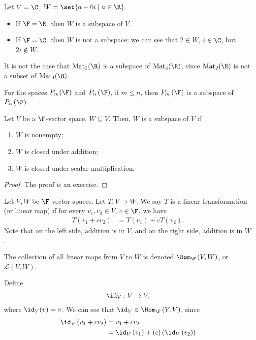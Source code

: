 \documentclass[10pt]{mypackage}
\begin{document}
\begin{example}[Subspaces of $\C$]
  Let $V = \C$, $W = \set{a + 0i\mid a\in \R}$.
  \begin{itemize}
    \item If $\F = \R$, then $W$ is a subspace of $V$.
    \item If $\F = \C$, then $W$ is not a subspace; we can see that $2\in W$, $i\in \C$, but $2i\notin W$.
  \end{itemize}
\end{example}
\begin{example}[Matrices]
  It is not the case that $\text{Mat}_2(\R)$ is a subspace of $\text{Mat}_4(\R)$, since $\text{Mat}_2(\R)$ is not a subset of $\text{Mat}_4(\R)$.
\end{example}
\begin{example}[Polynomials]
  For the spaces $P_{m}(\F)$ and $P_{n}\left(\F\right)$, if $m \leq n$, then $P_{m}\left(\F\right)$ is a subspace of $P_{n}\left(\F\right)$.
\end{example}
\begin{lemma}
  Let $V$ be a $\F$-vector space, $W\subseteq V$. Then, $W$ is a subspace of $V$ if
  \begin{enumerate}[(1)]
    \item $W$ is nonempty;
    \item $W$ is closed under addition;
    \item $W$ is closed under scalar multiplication.
  \end{enumerate}
\end{lemma}
\begin{proof}
  The proof is an exercise.
\end{proof}
\begin{definition}
  Let $V,W$ be $\F$-vector spaces. Let $T: V\rightarrow W$. We say $T$ is a linear transformation (or linear map) if for every $v_1,v_2\in V$, $c\in \F$, we have
  \begin{align*}
    T\left(v_1 + cv_2\right) &= T\left(v_1\right) + cT\left(v_2\right).
  \end{align*}
  Note that on the left side, addition is in $V$, and on the right side, addition is in $W$.\newline

  The collection of all linear maps from $V$ to $W$ is denoted $\Hom_{\F}\left(V,W\right)$, or $\mathcal{L}\left(V,W\right)$.
\end{definition}
\begin{example}
  Define
  \begin{align*}
    \id_{V}: V\rightarrow V,
  \end{align*}
  where $\id_V(v) = v$. We can see that $\id_V \in \Hom_{\F}\left(V,V\right)$, since
  \begin{align*}
    \id_V\left(v_1 + cv_2\right) &= v_1 + cv_2\\
                            &= \id_V\left(v_1\right) + (c)\left(\id_{V}\left(v_2\right)\right)
  \end{align*}
\end{example}
\end{document}
